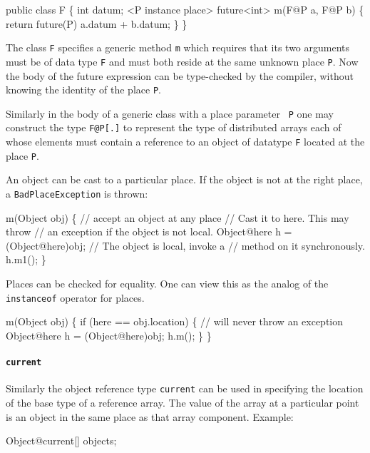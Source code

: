 \begin{x10}
public class F \{
  int datum;
  <P instance place> future<int> m(F@P a, F@P b) \{
    return future(P) {a.datum + b.datum;}
  \}
\}
\end{x10}
The class {\tt F} specifies a generic method {\tt m} which requires that 
its two arguments must be of data type {\tt F} and must both reside
at the same unknown place {\tt P}. Now the body of the {\cf future} expression
can be type-checked by the compiler, without knowing the identity 
of the place {\tt P}.

Similarly in the body of a generic class with a place parameter {\tt
P} one may construct the type {\tt F@P[.]} to represent the type of
distributed arrays each of whose elements must contain a reference to
an object of datatype {\tt F} located at the place {\tt P}.


An object can be cast to a particular place. If the object is not at
the right place, a {\tt BadPlaceException} is thrown:

\begin{x10}
m(Object obj) \{ // accept an object at any place
     // Cast it to here. This may throw
     // an exception if the object is not local.
     Object@here h = (Object@here)obj;
     // The object is local, invoke a
     // method on it synchronously.
     h.m1();
 \}
\end{x10}

Places can be checked for equality. One can view this as the analog of
the {\tt instanceof} operator for places.

\begin{x10}
m(Object obj) \{
    if (here == obj.location) \{
       // will never throw an exception
      Object@here h = (Object@here)obj;
      h.m();
   \}
\}
\end{x10}


\paragraph{{\tt current}}
Similarly the object reference type {\tt current} can be used in
specifying the location of the base type of a reference array. 
The value of the array at a particular point is an object in the
same place as that array component. Example:
\begin{x10}
    Object@current[] objects;
\end{x10}

